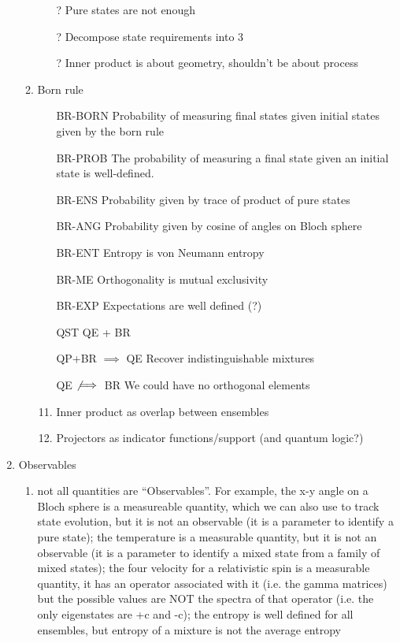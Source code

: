 \begin{enumerate}
\begin{enumerate}
\begin{enumerate}
			\item[?] Pure states are not enough
			\item[?] Decompose state requirements into 3
			\item[?] Inner product is about geometry, shouldn't be about process
		\end{enumerate}
		\item Born rule
		\begin{enumerate}
			\item[BR-BORN] Probability of measuring final states given initial states given by the born rule
			\item[BR-PROB] The probability of measuring a final state given an initial state is well-defined.
			\item[BR-ENS] Probability given by trace of product of pure states
			\item[BR-ANG] Probability given by cosine of angles on Bloch sphere
			\item[BR-ENT] Entropy is von Neumann entropy
			\item[BR-ME] Orthogonality is mutual exclusivity
			\item[BR-EXP] Expectations are well defined (?)
			\item[QST] QE + BR
			\item[QP+BR $\implies$ QE] Recover indistinguishable mixtures
			\item[QE $\nimplies$ BR] We could have no orthogonal elements
			\item Inner product as overlap between ensembles
			\item Projectors as indicator functions/support (and quantum logic?)
		\end{enumerate}
	\end{enumerate}
	\item Observables
	\begin{enumerate}
		\item not all quantities are ``Observables''. For example, the x-y angle on a Bloch sphere is a measureable quantity, which we can also use to track state evolution, but it is not an observable (it is a parameter to identify a pure state); the temperature is a measurable quantity, but it is not an observable (it is a parameter to identify a mixed state from a family of mixed states); the four velocity for a relativistic spin is a measurable quantity, it has an operator associated with it (i.e. the gamma matrices) but the possible values are NOT the spectra of that operator (i.e. the only eigenstates are +c and -c); the entropy is well defined for all ensembles, but entropy of a mixture is not the average entropy

\end{enumerate}
\end{enumerate}
